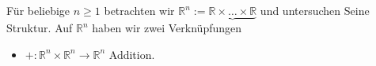 Für beliebige $n\geq 1$ betrachten wir $\mathbb{R}^n:=\underbrace{\mathbb{R}\times\dots\times\mathbb{R}}$  und untersuchen Seine Struktur. Auf $\mathbb{R}^n$ haben wir zwei Verknüpfungen
\begin{itemize}
    \item $+:\mathbb{R}^n\times\mathbb{R}^n\rightarrow\mathbb{R}^n$ Addition.
\end{itemize}








